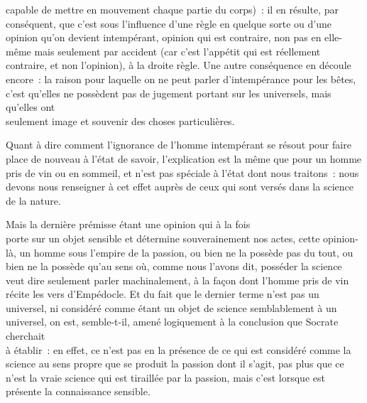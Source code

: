 \documentclass[french,twoside]{book} %
\begin{document}
capable de mettre en mouvement chaque partie du corps) : il en résulte, par conséquent, que c’est sous l’influence d’une règle  en quelque sorte ou d’une opinion qu’on devient intempérant, opinion qui est contraire, non pas en elle-même mais seulement par accident (car c’est l’appétit qui est réellement contraire, et non l’opinion), à la droite règle. Une autre conséquence en découle encore : la raison pour laquelle on ne peut parler d’intempérance pour les bêtes, c’est qu’elles ne possèdent pas de jugement portant sur les universels, mais qu’elles ont \\
seulement image et souvenir des choses particulières.\par
Quant à dire comment l’ignorance de l’homme intempérant se résout pour faire place de nouveau à l’état de savoir, l’explication est la même que pour un homme pris de vin ou en sommeil, et n’est pas spéciale à l’état dont nous traitons : nous devons nous renseigner à cet effet auprès de ceux qui sont versés dans la science de la nature.\par
Mais la dernière prémisse étant une opinion qui à la fois \\
porte sur un objet sensible et détermine souverainement nos actes, cette opinion-là, un homme sous l’empire de la passion, ou bien ne la possède pas du tout, ou bien ne la possède qu’au sens où, comme nous l’avons dit, posséder la science veut dire seulement parler machinalement, à la façon dont l’homme pris de vin récite les vers d’Empédocle. Et du fait que le dernier terme n’est pas un universel, ni considéré comme étant un objet de science semblablement à un universel, on est, semble-t-il, amené logiquement à la conclusion que Socrate cherchait \\
à établir : en effet, ce n’est pas en la présence de ce qui est considéré comme la science au sens propre que se produit la passion dont il s’agit, pas plus que ce n’est la vraie science qui est tiraillée par la passion, mais c’est lorsque est présente la connaissance sensible.
\end{document}
